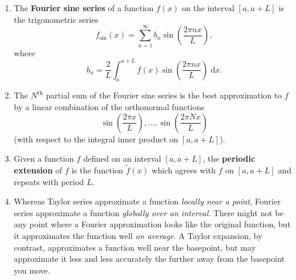 \documentclass{article}
\newcommand{\diff}{\;\mathrm{d}}
\begin{document}
\begin{enumerate}
	\item The \textbf{Fourier sine series} of a function $f(x)$ on the interval $[a,a+L]$ is the trigonometric series
		\[f_\mathrm{sin}(x)=\sum_{n=1}^\infty b_n\sin\left(\frac{2\pi nx}{L}\right),\]
		where
		\[b_n = \frac{2}{L}\int_a^{a+L} f(x)\sin\left(\frac{2\pi nx}{L}\right)\diff x.\]
	\item The $N^\mathrm{th}$ partial sum of the Fourier sine series is the best approximation to $f$ by a linear combination of the orthonormal functions
		\[\sin\left(\frac{2\pi x}{L}\right),\hdots, \sin\left(\frac{2\pi Nx}{L}\right)\]
		(with respect to the integral inner product on $[a,a+L]$).
	\item Given a function $f$ defined on an interval $[a,a+L]$, the \textbf{periodic extension} of $f$ is the function $\tilde{f}(x)$ which agrees with $f$ on $[a,a+L]$ and repeats with period $L$.
	\item Whereas Taylor series approximate a function \textit{locally near a point}, Fourier series approximate a function \textit{globally over an interval}. There might not be any point where a Fourier approximation looks like the original function, but it approximates the function well \textit{on average}. A Taylor expansion, by contrast, approximates a function well near the basepoint, but may approximate it less and less accurately the further away from the basepoint you move.
\end{enumerate}
\end{document}

